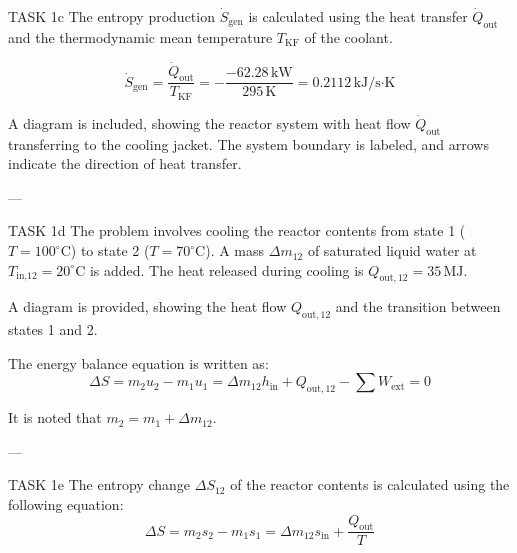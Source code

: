 TASK 1c  
The entropy production \( \dot{S}_{\text{gen}} \) is calculated using the heat transfer \( \dot{Q}_{\text{out}} \) and the thermodynamic mean temperature \( T_{\text{KF}} \) of the coolant.  

\[
\dot{S}_{\text{gen}} = \frac{\dot{Q}_{\text{out}}}{T_{\text{KF}}} = -\frac{-62.28 \, \text{kW}}{295 \, \text{K}} = 0.2112 \, \text{kJ/s·K}
\]

A diagram is included, showing the reactor system with heat flow \( \dot{Q}_{\text{out}} \) transferring to the cooling jacket. The system boundary is labeled, and arrows indicate the direction of heat transfer.  

---

TASK 1d  
The problem involves cooling the reactor contents from state 1 (\( T = 100^\circ\text{C} \)) to state 2 (\( T = 70^\circ\text{C} \)). A mass \( \Delta m_{12} \) of saturated liquid water at \( T_{\text{in,12}} = 20^\circ\text{C} \) is added. The heat released during cooling is \( Q_{\text{out},12} = 35 \, \text{MJ} \).  

A diagram is provided, showing the heat flow \( Q_{\text{out},12} \) and the transition between states 1 and 2.  

The energy balance equation is written as:  
\[
\Delta S = m_2 u_2 - m_1 u_1 = \Delta m_{12} h_{\text{in}} + Q_{\text{out},12} - \sum W_{\text{ext}} = 0
\]

It is noted that \( m_2 = m_1 + \Delta m_{12} \).  

---

TASK 1e  
The entropy change \( \Delta S_{12} \) of the reactor contents is calculated using the following equation:  
\[
\Delta S = m_2 s_2 - m_1 s_1 = \Delta m_{12} s_{\text{in}} + \frac{Q_{\text{out}}}{T}
\]